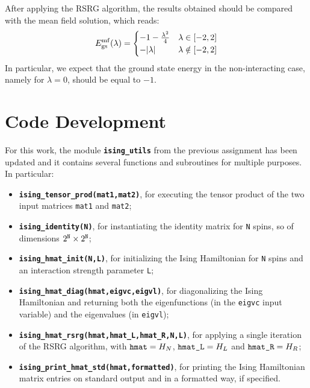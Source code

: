 \documentclass[pra, onecolumn, notitlepage, floats, 11pt]{revtex4-1}
\newcommand{\codebold}[2][cobalt]{\texttt{\bfseries {\color{#1}#2}}}
\newcommand{\code}[2][black]{\color{#1}\texttt{#2}}
\newcommand{\codefunctionbold}[2]{\texttt{\bfseries {\color{cobalt}#1}({\color{lava}#2})}}
\begin{document}
After applying the RSRG algorithm, the results obtained should be compared with the mean field solution, which reads:
\begin{equation}
    E_{\mathrm{gs}}^{\mathrm{mf}}(\lambda)
    =
    \begin{cases}
        - 1 - \frac{\lambda^{2}}{4}     &   \lambda \in [-2,2]  \\
        - \abs{\lambda}                 &   \lambda \notin [-2,2]
    \end{cases}
    \label{eq:10_T_6}
\end{equation}
In particular, we expect that the ground state energy in the non-interacting case, namely for \( \lambda = 0 \), should be equal to \( -1 \).





\section{Code Development}
For this work, the module \codebold{ising\_utils} from the previous assignment has been updated and it contains several functions and subroutines for multiple purposes. In particular:
\vspace{-5pt}
\begin{itemize}%
    \setlength\itemsep{-3pt}
    \item \codefunctionbold{ising\_tensor\_prod}{mat1,mat2}, for executing the tensor product of the two input matrices \code{mat1} and \code{mat2};
    \item \codefunctionbold{ising\_identity}{N}, for instantiating the identity matrix for \code{N} spins, so of dimensions \( 2^{\code{N}} \times 2^{\code{N}} \);
    \item \codefunctionbold{ising\_hmat\_init}{N,L}, for initializing the Ising Hamiltonian for \code{N} spins and an interaction strength parameter \code{L};
    \item \codefunctionbold{ising\_hmat\_diag}{hmat,eigvc,eigvl}, for diagonalizing the Ising Hamiltonian and returning both the eigenfunctions (in the \code{eigvc} input variable) and the eigenvalues (in \code{eigvl});
    \item \codefunctionbold{ising\_hmat\_rsrg}{hmat,hmat\_L,hmat\_R,N,L}, for applying a single iteration of the RSRG algorithm, with \( \code{hmat} = H_{N} \), \( \code{hmat\_L} = H_{L} \) and \( \code{hmat\_R} = H_{R} \);
    \item \codefunctionbold{ising\_print\_hmat\_std}{hmat,formatted}, for printing the Ising Hamiltonian matrix entries on standard output and in a formatted way, if specified.
\end{itemize}
\end{document}
